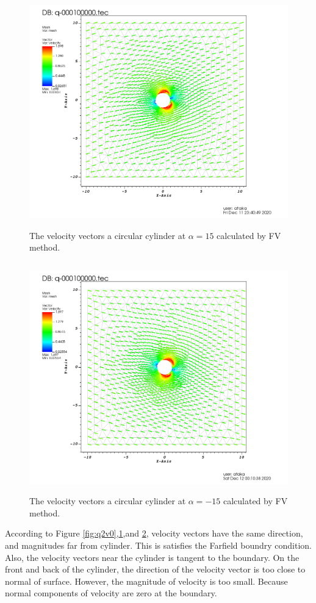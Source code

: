 \documentclass[letterpaper,12pt]{article}
\begin{document}
\begin{figure} [ht]
	\centering
	\includegraphics[height = 10cm]{graph/15deg/Cylinder_15angle_vector0000.png}
	\caption{The velocity vectors a circular cylinder at $\alpha=15$ calculated by FV method.}
    \label{fig:q2v15}
\end{figure}
\begin{figure} [ht]
	\centering
	\includegraphics[height = 10cm]{graph/neg15deg/Cylinder_neg15angle_vector0000.png}
	\caption{The velocity vectors a circular cylinder at $\alpha=-15$ calculated by FV method.}
    \label{fig:q2v-15}
\end{figure}
According to Figure \ref{fig:q2v0},\ref{fig:q2v15},and \ref{fig:q2v-15}, velocity vectors have the 
same direction, and magnitudes far from cylinder. This is satisfies the Farfield boundry condition.
Also, the velocity vectors near the cylinder is tangent to the boundary. On the front and back of the 
cylinder, the direction of the velocity vector is too close to normal of surface. However, the 
magnitude of velocity is too small. Because normal components of velocity are zero at the boundary.
\end{document}
